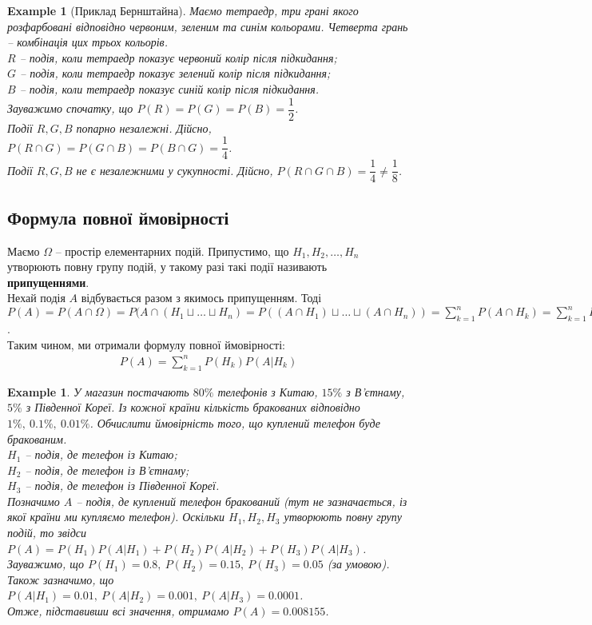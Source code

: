 \documentclass[a4paper, 10pt]{article}
\theoremstyle{theoremdd}
\newtheorem{example}[theorem]{Example}
\begin{document}
\begin{example}[Приклад Бернштайна]
Маємо тетраедр, три грані якого розфарбовані відповідно червоним, зеленим та синім кольорами. Четверта грань -- комбінація цих трьох кольорів.\\
$R$ -- подія, коли тетраедр показує червоний колір після підкидання;\\
$G$ -- подія, коли тетраедр показує зелений колір після підкидання;\\
$B$ -- подія, коли тетраедр показує синій колір після підкидання.\\
Зауважимо спочатку, що $P(R) = P(G) = P(B) = \dfrac{1}{2}$.\\
Події $R,G,B$ попарно незалежні. Дійсно, $P(R \cap G) = P(G \cap B) = P(B \cap G) = \dfrac{1}{4}$.\\
Події $R,G,B$ не є незалежними у сукупності. Дійсно, $P(R \cap G \cap B) = \dfrac{1}{4} \neq \dfrac{1}{8}$.
\end{example}

\subsection{Формула повної ймовірності}
Маємо $\Omega$ -- простір елементарних подій. Припустимо, що $H_1,H_2,\dots,H_n$ утворюють повну групу подій, у такому разі такі події називають \textbf{припущеннями}.\\
Нехай подія $A$ відбувається разом з якимось припущенням. Тоді\\
$\displaystyle P(A) = P\left(A \cap \Omega\right) = P( A \cap (H_1 \sqcup \dots \sqcup H_n) = P((A \cap H_1) \sqcup \dots \sqcup (A \cap H_n)) = \sum_{k=1}^n P(A \cap H_k) = \sum_{k=1}^n P(H_k) P(A|H_k)$.\\
Таким чином, ми отримали формулу повної ймовірності:
\begin{align*}
P(A) = \sum_{k=1}^n P(H_k) P(A|H_k)
\end{align*}

\begin{example}
У магазин постачають $80\%$ телефонів з Китаю, $15\%$ з В'єтнаму, $5\%$ з Південної Кореї. Із кожної країни кількість бракованих відповідно $1\% ,\ 0.1\% ,\ 0.01\%$. Обчислити ймовірність того, що куплений телефон буде бракованим.\\
$H_1$ -- подія, де телефон із Китаю;\\
$H_2$ -- подія, де телефон із В'єтнаму;\\
$H_3$ -- подія, де телефон із Південної Кореї.\\
Позначимо $A$ -- подія, де куплений телефон бракований (тут не зазначається, із якої країни ми купляємо телефон). Оскільки $H_1,H_2,H_3$ утворюють повну групу подій, то звідси\\
$P(A) = P(H_1) P(A|H_1) + P(H_2) P(A|H_2) + P(H_3) P(A|H_3)$.\\
Зауважимо, що $P(H_1) = 0.8,\ P(H_2) = 0.15,\ P(H_3) = 0.05$ (за умовою).\\
Також зазначимо, що $P(A|H_1) = 0.01,\ P(A|H_2) = 0.001,\ P(A|H_3) = 0.0001$.\\
Отже, підставивши всі значення, отримамо $P(A) = 0.008155$.
\end{example}
\end{document}
